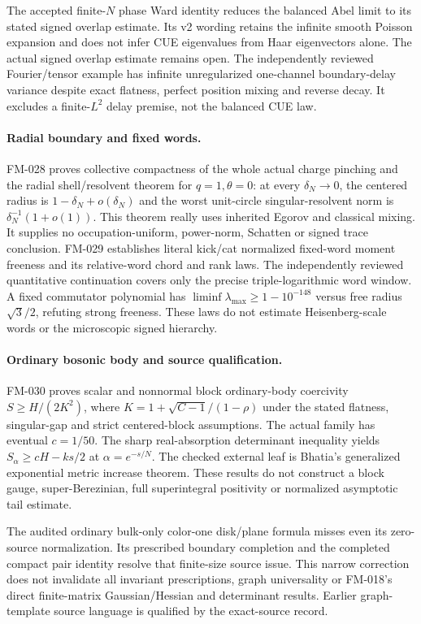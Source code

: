 The accepted finite-$N$ phase Ward identity reduces the balanced Abel
limit to its stated signed overlap estimate. Its v2 wording retains the
infinite smooth Poisson expansion and does not infer CUE eigenvalues from
Haar eigenvectors alone. The actual signed overlap estimate remains open.
The independently reviewed Fourier/tensor example has infinite
unregularized one-channel boundary-delay variance despite exact flatness,
perfect position mixing and reverse decay. It excludes a finite-$L^2$
delay premise, not the balanced CUE law.

\paragraph{Radial boundary and fixed words.}
FM-028 proves collective compactness of the whole actual charge pinching
and the radial shell/resolvent theorem for $q=1,\theta=0$: at every
$\delta_N\to0$, the centered radius is $1-\delta_N+o(\delta_N)$ and the
worst unit-circle singular-resolvent norm is
$\delta_N^{-1}(1+o(1))$. This theorem really uses inherited Egorov and
classical mixing. It supplies no occupation-uniform, power-norm, Schatten
or signed trace conclusion.
FM-029 establishes literal kick/cat normalized fixed-word moment freeness
and its relative-word chord and rank laws. The independently reviewed quantitative continuation covers only the
precise triple-logarithmic word window. A fixed commutator polynomial has
$\liminf\lambda_{\max}\ge1-10^{-148}$ versus free radius
$\sqrt{3}/2$, refuting strong freeness. These laws do not estimate
Heisenberg-scale words or the microscopic signed hierarchy.

\paragraph{Ordinary bosonic body and source qualification.}
FM-030 proves scalar and nonnormal block ordinary-body coercivity
$S\ge H/(2K^2)$, where $K=1+\sqrt{C-1}/(1-\rho)$ under the stated
flatness, singular-gap and strict centered-block assumptions. The actual
family has eventual $c=1/50$. The sharp real-absorption determinant
inequality yields $S_\alpha\ge cH-ks/2$ at $\alpha=e^{-s/N}$.
The checked external leaf is Bhatia's generalized exponential metric
increase theorem. These results do not construct a block gauge,
super-Berezinian, full superintegral positivity or normalized asymptotic
tail estimate.

The audited ordinary bulk-only color-one disk/plane formula misses even
its zero-source normalization. Its prescribed boundary completion and the
completed compact pair identity resolve that finite-size source issue.
This narrow correction does not invalidate all invariant prescriptions,
graph universality or FM-018's direct finite-matrix Gaussian/Hessian and
determinant results. Earlier graph-template source language is qualified
by the exact-source record.

